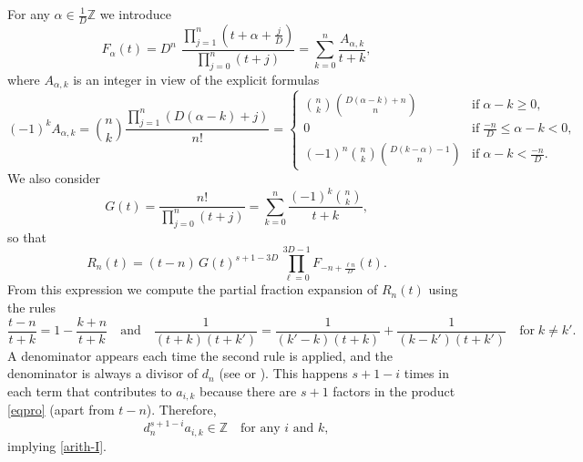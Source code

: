 \documentclass{article}
\numberwithin{equation}{section}
\theoremstyle{remark}
\newenvironment{Proof}[1][Proof]{\proof[\rm\textbf{#1}]}{\endproof}
\newcommand{\Z}{\mathbb{Z}}
\begin{document}
\begin{Proof}[Proof of Lemma~\ref{lemarith}]
For any $\alpha\in\frac1{D}\Z$ we introduce
$$F_\alpha(t) = D^n \, \, \frac{\prod_{j=1}^n (t+\alpha+\frac{j}{D})}{\prod_{j=0}^n( t+j)} = \sum_{k=0}^n \frac{A_{\alpha,k}}{t+k},$$
where $A_{\alpha,k}$ is an integer in view of the explicit formulas
$$(-1)^k A_{\alpha,k} = \binom{n}{k} \frac{\prod_{j=1}^n (D( \alpha-k)+j )}{n!} = \begin{cases}
\binom{n}{k} \binom{D( \alpha-k) +n}{n} &\mbox{if}\; \alpha-k\geq 0, \\
0 &\mbox{if}\; \frac{-n}{D} \leq \alpha-k < 0, \\
(-1)^n \binom{n}{k} \binom{D(k- \alpha) -1}{n} &\mbox{if}\; \alpha-k < \frac{-n}{D} .
\end{cases}$$
We also consider
$$G(t) = \frac{n!}{\prod_{j=0}^n (t+j)} = \sum_{k=0}^n \frac{ (-1)^k \binom{n}{k} }{t+k},$$
so that 
\begin{equation} \label{eqpro}
R_n(t) = (t-n) \, G(t)^{s+1-3D} \, \prod_{\ell = 0 }^{3D-1} F_{-n+\frac{\ell n}{D}}(t).
\end{equation}
From this expression we compute the partial fraction expansion of $R_n(t)$ using the rules
$$ 
\frac{t-n}{t+k} = 1 - \frac{k+n}{t+k}
\quad\mbox{and}\quad
 \frac{1}{(t+k)(t+k')} = \frac{1}{(k'-k)(t+k)}+\frac{1}{(k- k')(t+k')} \quad\mbox{for}\; k\neq k'.$$
 A denominator appears each time the second rule is applied, and the denominator is always a divisor of $d_n$ (see \cite{Colmez} or \cite[Lemma~1]{Zudilintrick}). This happens $s+1-i$ times in each term that contributes to $a_{i,k}$ because there are $s+1$ factors in the product \eqref{eqpro} (apart from $t-n$).
Therefore,
 $$d_{n}^{s+1-i} a_{i,k} \in \Z \quad\mbox{for any $i$ and $k$},$$
implying \eqref{arith-I}.

\bigskip


\end{Proof}
\end{document}
